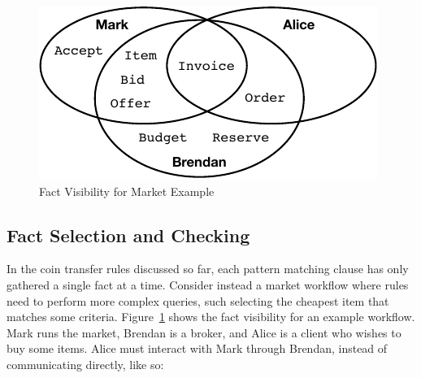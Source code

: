

\begin{figure}
\begin{center}
\includegraphics{figure/auction-visibility.pdf}
\end{center}
\vspace{-2ex}
\caption{Fact Visibility for Market Example}
\label{f:AuctionVisibility}
\end{figure}


\subsection{Fact Selection and Checking}
\label{s:Query}
\label{s:Selection}
In the coin transfer rules discussed so far, each pattern matching clause has only gathered a single fact at a time. Consider instead a market workflow where rules need to perform more complex queries, such selecting the cheapest item that matches some criteria. Figure~\ref{f:AuctionVisibility} shows the fact visibility for an example workflow. Mark runs the market, Brendan is a broker, and Alice is a client who wishes to buy some items. Alice must interact with Mark through Brendan, instead of communicating directly, like so:

